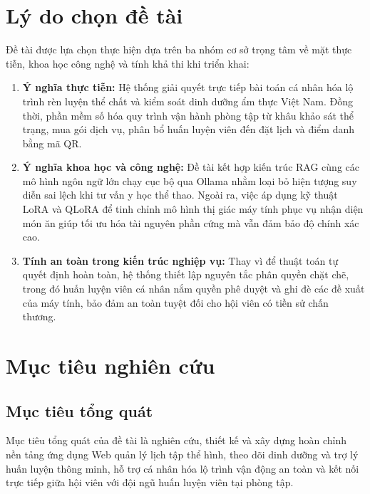 \section{Lý do chọn đề tài}
\label{sec:lydo}

Đề tài được lựa chọn thực hiện dựa trên ba nhóm cơ sở trọng tâm về mặt thực tiễn, khoa học công nghệ và tính khả thi khi triển khai:

\begin{enumerate}[label=\arabic*)]
    \item \textbf{Ý nghĩa thực tiễn:} Hệ thống giải quyết trực tiếp bài toán cá nhân hóa lộ trình rèn luyện thể chất và kiểm soát dinh dưỡng ẩm thực Việt Nam. Đồng thời, phần mềm số hóa quy trình vận hành phòng tập từ khâu khảo sát thể trạng, mua gói dịch vụ, phân bổ huấn luyện viên đến đặt lịch và điểm danh bằng mã QR.
    \item \textbf{Ý nghĩa khoa học và công nghệ:} Đề tài kết hợp kiến trúc RAG \cite{lewis2020rag} cùng các mô hình ngôn ngữ lớn chạy cục bộ qua Ollama \cite{ollama2026docs} nhằm loại bỏ hiện tượng suy diễn sai lệch khi tư vấn y học thể thao. Ngoài ra, việc áp dụng kỹ thuật LoRA \cite{hu2022lora} và QLoRA \cite{dettmers2023qlora} để tinh chỉnh mô hình thị giác máy tính phục vụ nhận diện món ăn giúp tối ưu hóa tài nguyên phần cứng mà vẫn đảm bảo độ chính xác cao.
    \item \textbf{Tính an toàn trong kiến trúc nghiệp vụ:} Thay vì để thuật toán tự quyết định hoàn toàn, hệ thống thiết lập nguyên tắc phân quyền chặt chẽ, trong đó huấn luyện viên cá nhân nắm quyền phê duyệt và ghi đè các đề xuất của máy tính, bảo đảm an toàn tuyệt đối cho hội viên có tiền sử chấn thương.
\end{enumerate}

\section{Mục tiêu nghiên cứu}
\label{sec:muctieu}

\subsection{Mục tiêu tổng quát}
\label{subsec:muctieu_tongquat}

Mục tiêu tổng quát của đề tài là nghiên cứu, thiết kế và xây dựng hoàn chỉnh nền tảng ứng dụng Web quản lý lịch tập thể hình, theo dõi dinh dưỡng và trợ lý huấn luyện thông minh, hỗ trợ cá nhân hóa lộ trình vận động an toàn và kết nối trực tiếp giữa hội viên với đội ngũ huấn luyện viên tại phòng tập.

